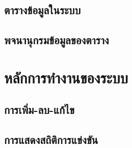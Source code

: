 \subsection{ตารางข้อมูลในระบบ}


\subsection{พจนานุกรมข้อมูลของตาราง}








\section{หลักการทำงานของระบบ}

\subsection{การเพิ่ม-ลบ-แก้ไข}

\subsection{การแสดงสถิติการแข่งขัน}